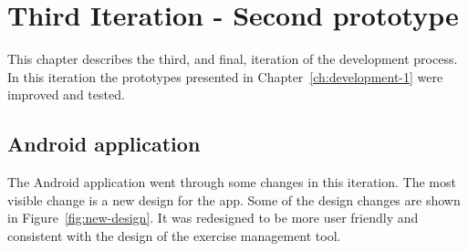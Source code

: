 \documentclass[../Main/thesis.tex]{subfiles}
\begin{document}
\chapter{Third Iteration - Second prototype}
\label{ch:development-2}
This chapter describes the third, and final, iteration of the development process.
In this iteration the prototypes presented in Chapter~\ref{ch:development-1} were improved and tested.

\section{Android application}
The Android application went through some changes in this iteration.
The most visible change is a new design for the app.
Some of the design changes are shown in Figure~\ref{fig:new-design}.
It was redesigned to be more user friendly and consistent with the design of the exercise management tool.
\end{document}
